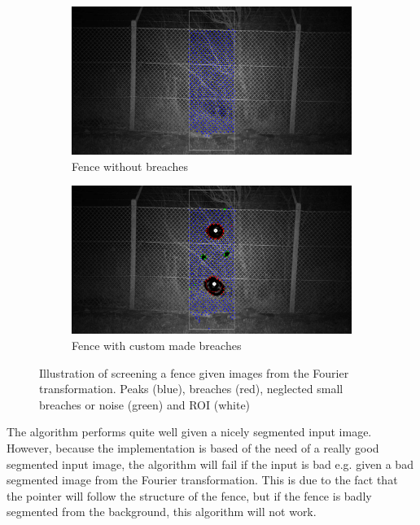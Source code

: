 \documentclass[../Head/Main.tex]{subfiles}
\begin{document}
\begin{figure}[H]
    \centering
    \begin{subfigure}{.49\textwidth}
        \centering
        \includegraphics[width=\textwidth]{../Figures/screening_algorithm/fence_clean_peaks.png}
        \caption{Fence without breaches}
        \label{fig:screening_clean_peaks}
    \end{subfigure}
    \begin{subfigure}{.49\textwidth}
        \centering
        \includegraphics[width=\textwidth]{../Figures/screening_algorithm/fence_breach_peaks.png}
        \caption{Fence with custom made breaches}
        \label{fig:screening_breaches_peaks}
    \end{subfigure}
    \caption{Illustration of screening a fence given images from the Fourier transformation. Peaks (blue), breaches (red), neglected small breaches or noise (green) and ROI (white)}
     \label{fig:screening_algorihtm}
\end{figure}
\vspace{-15pt}
The algorithm performs quite well given a nicely segmented input image. However, because the implementation is based of the need of a really good segmented input image, the algorithm will fail if the input is bad e.g. given a bad segmented image from the Fourier transformation. This is due to the fact that the pointer will follow the structure of the fence, but if the fence is badly segmented from the background, this algorithm will not work. 
\end{document}
